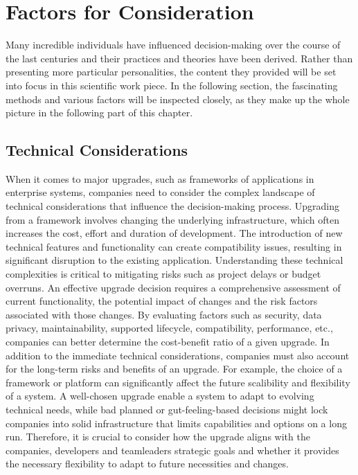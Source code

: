 \newpage
\section{Factors for Consideration}
\label{chapter:decision_making_factors_for_consideration}
Many incredible individuals have influenced decision-making over the course of the last centuries and their practices and theories have been derived. Rather than presenting more particular personalities, the content they provided will be set into focus in this scientific work piece. 
\newline \noindent In the following section, the fascinating methods and various factors will be inspected closely, as they make up the whole picture in the following part of this chapter. 

\subsection{Technical Considerations}
When it comes to major upgrades, such as frameworks of applications in enterprise systems, companies need to consider the complex landscape of technical considerations that influence the decision-making process. Upgrading from a framework involves changing the underlying infrastructure, which often increases the cost, effort and duration of development. The introduction of new technical features and functionality can create compatibility issues, resulting in significant disruption to the existing application. 
\newline \noindent Understanding these technical complexities is critical to mitigating risks such as project delays or budget overruns. An effective upgrade decision requires a comprehensive assessment of current functionality, the potential impact of changes and the risk factors associated with those changes. By evaluating factors such as security, data privacy, maintainability, supported lifecycle, compatibility, performance, etc., companies can better determine the cost-benefit ratio of a given upgrade. 
\newline \noindent In addition to the immediate technical considerations, companies must also account for the long-term risks and benefits of an upgrade. For example, the choice of a framework or platform can significantly affect the future scalibility and flexibility of a system. A well-chosen upgrade enable a system to adapt to evolving technical needs, while bad planned or gut-feeling-based decisions might lock companies into solid infrastructure that limits capabilities and options on a long run. Therefore, it is crucial to consider how the upgrade aligns with the companies, developers and teamleaders strategic goals and whether it provides the necessary flexibility to adapt to future necessities and changes. 
